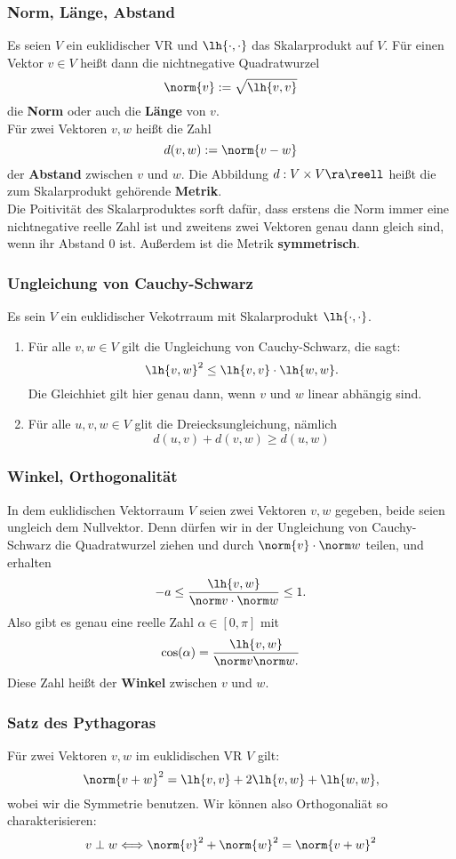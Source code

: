 \documentclass{kit}
\begin{document}
    \subsubsection{Norm, Länge, Abstand}
      Es seien $V$ ein euklidischer VR und $\lh{\cdot,\cdot}$ das Skalarprodukt auf $V$. Für einen Vektor $v\in V$ heißt
      dann die nichtnegative Quadratwurzel
      $$\norm{v}:=\sqrt{\lh{v,v}}$$
      die \textbf{Norm} oder auch die \textbf{Länge} von $v$.\\
      Für zwei Vektoren $v,w$ heißt die Zahl
      $$d(v,w):=\norm{v-w}$$
      der \textbf{Abstand} zwischen $v$ und $w$. Die Abbildung $d:V\times V\ra\reell$ heißt die zum Skalarprodukt
      gehörende \textbf{Metrik}.\\
      Die Poitivität des Skalarproduktes sorft dafür, dass erstens die Norm immer eine nichtnegative reelle Zahl ist und
      zweitens zwei Vektoren genau dann gleich sind, wenn ihr Abstand 0 ist. Außerdem ist die Metrik \textbf{symmetrisch}.
    \subsubsection{Ungleichung von Cauchy-Schwarz}
      Es sein $V$ ein euklidischer Vekotrraum mit Skalarprodukt $\lh{\cdot,\cdot}$.
      \begin{enumerate}
        \item Für alle $v,w\in V$ gilt die Ungleichung von Cauchy-Schwarz, die sagt:
          $$\lh{v,w}^2\le\lh{v,v}\cdot\lh{w,w}.$$
          Die Gleichhiet gilt hier genau dann, wenn $v$ und $w$ linear abhängig sind.
        \item Für alle $u,v,w\in V$ glit die Dreiecksungleichung, nämlich
          $$d(u,v)+d(v,w)\ge d(u,w)$$
      \end{enumerate}
    \subsubsection{Winkel, Orthogonalität}
      In dem euklidischen Vektorraum $V$ seien zwei Vektoren $v,w$ gegeben, beide seien ungleich dem Nullvektor. Denn dürfen
      wir in der Ungleichung von Cauchy-Schwarz die Quadratwurzel ziehen und durch $\norm{v}\cdot \norm w$ teilen, und 
      erhalten
      $$-a\le\frac{\lh{v,w}}{\norm v\cdot\norm w}\le1.$$
      Also gibt es genau eine reelle Zahl $\alpha\in[0,\pi]$ mit
      $$\cos(\alpha)=\frac{\lh{v,w}}{\norm v\norm w.}$$
      Diese Zahl heißt der \textbf{Winkel} zwischen $v$ und $w$.
    \subsubsection{Satz des Pythagoras}
      Für zwei Vektoren $v,w$ im euklidischen VR $V$ gilt:
      $$\norm{v+w}^2=\lh{v,v}+2\lh{v,w}+\lh{w,w},$$
      wobei wir die Symmetrie benutzen. Wir können also Orthogonaliät so charakterisieren:
      $$v\perp w\Longleftrightarrow\norm{v}^2+\norm{w}^2=\norm{v+w}^2$$
\end{document}
